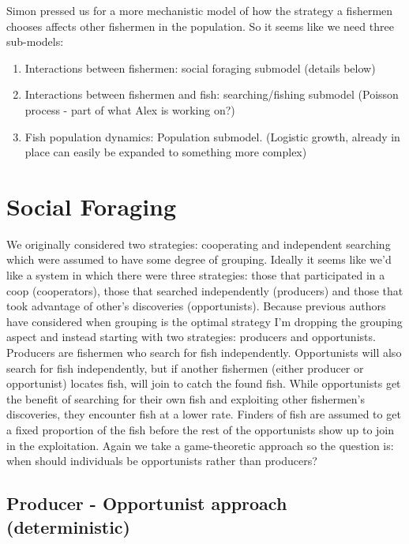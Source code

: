 \documentclass[11pt]{article}
\begin{document}
Simon pressed us for a more mechanistic model of how the strategy a fishermen chooses affects other fishermen in the population. So it seems like we need three sub-models:

\begin{enumerate}
\def\labelenumi{\arabic{enumi}.}
\itemsep1pt\parskip0pt
\item
  Interactions between fishermen: social foraging submodel (details below)
\item
  Interactions between fishermen and fish: searching/fishing submodel (Poisson process - part of what Alex is working on?)
\item
  Fish population dynamics: Population submodel. (Logistic growth, already in place can easily be expanded to something more complex)
\end{enumerate}

\section*{Social Foraging}

We originally considered two strategies: cooperating and independent searching which were assumed to have some degree of grouping. Ideally it seems like we'd like a system in which there were three strategies: those that participated in a coop (cooperators), those that searched independently (producers) and those that took advantage of other's discoveries (opportunists). Because previous authors have considered when grouping is the optimal strategy \citep{ClarkMangel:1979, MangelClark:1983} I'm dropping the grouping aspect and instead starting with two strategies: producers and opportunists. Producers are fishermen who search for fish independently. Opportunists will also search for fish independently, but if another fishermen (either producer or opportunist) locates fish, will join to catch the found fish. While opportunists get the benefit of searching for their own fish and exploiting other fishermen's discoveries, they encounter fish at a lower rate. Finders of fish are assumed to get a fixed proportion of the fish before the rest of the opportunists show up to join in the exploitation. Again we take a game-theoretic approach so the question is: when should individuals be opportunists rather than producers?

\subsection*{Producer - Opportunist approach (deterministic)}
\end{document}
